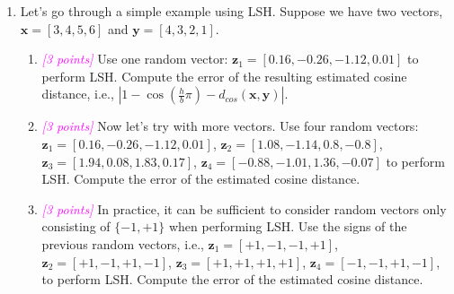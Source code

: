 \documentclass{exam}
\newcommand{\xv}{\mathbf{x}}
\newcommand{\yv}{\mathbf{y}}
\newcommand{\zv}{\mathbf{z}}
\newcommand{\grade}[1]{\small\textcolor{magenta}{\emph{[#1 points]}} \normalsize}
\newcommand{\sol}[1]{\ifshowsolutions{\leavevmode{\color{blue}Solution: #1}}\fi}
\newif\ifshowsolutions
\begin{document}
\begin{enumerate}[label=(\alph*)]
\sol{From part (c), we have $\cos(\theta(\xv,\yv)) = \cos(\pi (1-P[h_z(\xv)=h_z(\yv)]))$. Using LSH, we estimate $P[h_z(\xv)=h_z(\yv)] =1- \frac{h}{b}$. Thus, we have $\cos(\theta(\xv,\yv) \approx \cos(\pi (1-(1-\frac{h}{b}))) = \cos(\pi \frac{h}{b})$}
    
    
    \newpage
    \item Let's go through a simple example using LSH. Suppose we have two vectors, $\xv = [3,4,5,6]$ and $\yv=[4,3,2,1]$.
    \begin{enumerate}[label=\roman*.]
        \item \grade{3} Use one random vector: $\zv_1 = [0.16, -0.26, -1.12, 0.01]$ to perform LSH. Compute the error of the resulting estimated cosine distance, i.e., $|1 - \cos\left(\frac{h}{b}\pi\right) - d_{cos}(\xv,\yv)|$. 
        
        \sol{error = $|1-cos(0)-d_{cos}(\xv,\yv)| = 0.7875$.}
        \vspace{8em}
        \item \grade{3} Now let's try with more vectors. Use four random vectors: $\zv_1 = [0.16, -0.26, -1.12, 0.01]$, $\zv_2=[1.08,-1.14,0.8,-0.8]$, $\zv_3 = [1.94, 0.08, 1.83, 0.17]$, $\zv_4=[-0.88, -1.01, 1.36, -0.07]$ to perform LSH. Compute the error of the estimated cosine distance.
        
        \sol{error = $0.29 -d_{cos}(\xv,\yv) = 0.08$}
        \vspace{8em}
        \item \grade{3} In practice, it can be sufficient to consider random vectors only consisting of $\{-1,+1\}$ when performing LSH. Use the signs of the previous random vectors, i.e., $\zv_1 = [+1, -1, -1, +1]$, $\zv_2=[+1,-1,+1,-1]$, $\zv_3 = [+1,+1,+1,+1]$, $\zv_4=[-1,-1,+1,-1]$, to perform LSH. Compute the error of the estimated cosine distance.
        
        \sol{The result is the same as the previous question, i.e., error = $0.29 -d_{cos}(\xv,\yv) = 0.08$}
    \end{enumerate}
\end{enumerate}
\end{document}
